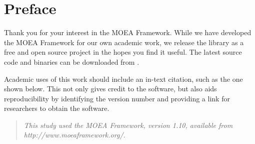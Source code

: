 %
%

\chapter*{Preface}

Thank you for your interest in the MOEA Framework.  While we have developed the MOEA Framework for our own academic work, we release the library as a free and open source project in the hopes you find it useful.  The latest source code and binaries can be downloaded from .

Academic uses of this work should include an in-text citation, such as the one shown below.  This not only gives credit to the software, but also aids reproducibility by identifying the version number and providing a link for researchers to obtain the software.

\begin{quote}
  \textit{This study used the MOEA Framework, version 1.10, available from http://www.moeaframework.org/.}
\end{quote}